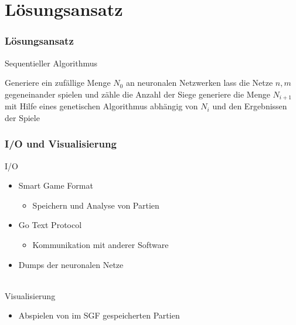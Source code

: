 \documentclass[compress]{beamer}
\begin{document}

\section{Lösungsansatz}
\begin{frame}
    \frametitle{Lösungsansatz}

    Sequentieller Algorithmus
    \begin{algorithm}[H]
        \begin{algorithmic}[1]
            \State Generiere ein zufällige Menge $N_0$ an neuronalen Netzwerken
                    \State lass die Netze $n, m$ gegeneinander spielen
                    \State und zähle die Anzahl der Siege
                \EndFor
                \State generiere die Menge $N_{i+1}$ mit Hilfe eines genetischen
                Algorithmus abhängig von $N_i$ und den Ergebnissen der Spiele
            \EndFor
        \end{algorithmic}
    \end{algorithm}
\end{frame}
\begin{frame}
    \frametitle{I/O und Visualisierung}

    I/O
    \begin{itemize}
        \item Smart Game Format
            \begin{itemize}
                \item Speichern und Analyse von Partien
            \end{itemize}
        \item Go Text Protocol
            \begin{itemize}
                \item Kommunikation mit anderer Software
            \end{itemize}
        \item Dumps der neuronalen Netze
    \end{itemize}
    
    \hfill \\
    Visualisierung
    \begin{itemize}
        \item Abspielen von im SGF gespeicherten Partien
    \end{itemize}

\end{frame}
\end{document}
